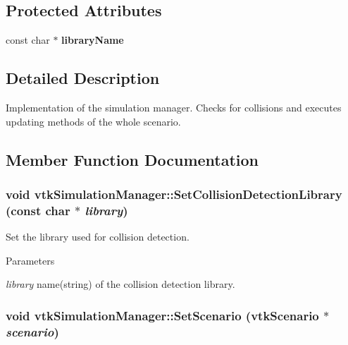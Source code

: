 \subsection*{Protected Attributes}
\begin{DoxyCompactItemize}
\item 
\hypertarget{classvtkSimulationManager_a8260e8c2d7a75ecc9583c79f5c8bece7}{
const char $\ast$ {\bfseries libraryName}}
\label{classvtkSimulationManager_a8260e8c2d7a75ecc9583c79f5c8bece7}

\end{DoxyCompactItemize}


\subsection{Detailed Description}
Implementation of the simulation manager. Checks for collisions and executes updating methods of the whole scenario. 

\subsection{Member Function Documentation}
\hypertarget{classvtkSimulationManager_ad7d4702f7cd3311710f3c0994ef92475}{
\subsubsection[{SetCollisionDetectionLibrary}]{\setlength{\rightskip}{0pt plus 5cm}void vtkSimulationManager::SetCollisionDetectionLibrary (const char $\ast$ {\em library})}}
\label{classvtkSimulationManager_ad7d4702f7cd3311710f3c0994ef92475}


Set the library used for collision detection. 
\begin{DoxyParams}{Parameters}
\item[{\em library}]name(string) of the collision detection library. \end{DoxyParams}
\hypertarget{classvtkSimulationManager_a44b0a480f8acf9ca9f5d38e93b387fd7}{
\subsubsection[{SetScenario}]{\setlength{\rightskip}{0pt plus 5cm}void vtkSimulationManager::SetScenario ({\bf vtkScenario} $\ast$ {\em scenario})}}
\label{classvtkSimulationManager_a44b0a480f8acf9ca9f5d38e93b387fd7}


